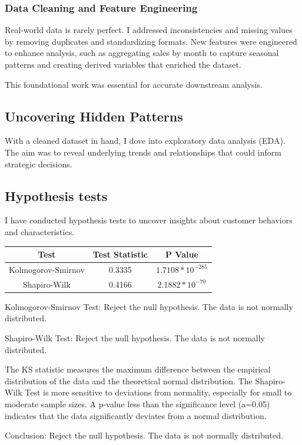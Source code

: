 \documentclass[a4paper]{article}
\begin{document}
\begin{multicols}{2}

\subsubsection{Data Cleaning and Feature Engineering}
Real-world data is rarely perfect. I addressed inconsistencies and missing values by removing duplicates and standardizing formats.
New features were engineered to enhance analysis, such as aggregating sales by month to capture seasonal patterns and creating derived variables that enriched the dataset.

This foundational work was essential for accurate downstream analysis.


\subsection{Uncovering Hidden Patterns}
With a cleaned dataset in hand, I dove into exploratory data analysis (EDA). The aim was to reveal underlying trends and relationships that could inform strategic decisions.


\subsection{Hypothesis tests}
I have conducted hypothesis tests to uncover insights about customer behaviors and characteristics.

\begin{minipage}{\columnwidth}
\label{table:table1}
\centering
\begin{tabular}{|c|c|c|}
    \hline
    \textbf{Test} & \textbf{Test Statistic} & \textbf{P Value} \\
    \hline
    Kolmogorov-Smirnov& 0.3335 & $1.7108*10^{-285}$ \\
    Shapiro-Wilk & 0.4166 & $2.1882*10^{-70}$ \\
    \hline
\end{tabular}
\end{minipage}


Kolmogorov-Smirnov Test: Reject the null hypothesis. The data is not normally distributed.

Shapiro-Wilk Test: Reject the null hypothesis. The data is not normally distributed.

The KS statistic measures the maximum difference between the empirical distribution of the data and the theoretical normal distribution.
The Shapiro-Wilk Test is more sensitive to deviations from normality, especially for small to moderate sample sizes.
A p-value less than the significance level (a=0.05) indicates that the data significantly deviates from a normal distribution.

Conclusion: Reject the null hypothesis. The data is not normally distributed.


\end{multicols}
\end{document}
